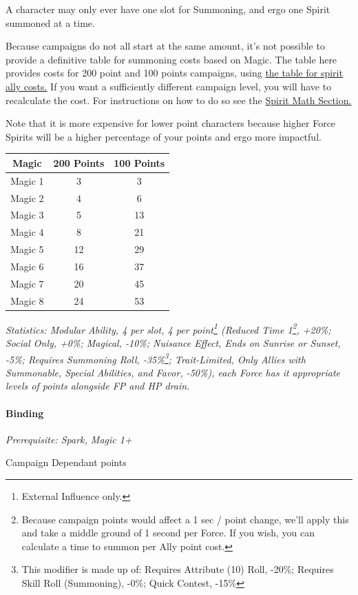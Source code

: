 \begin{multicols*}{3}
	A character may only ever have one slot for Summoning, and ergo one Spirit summoned at a time.
	
	Because campaigns do not all start at the same amount, it's not possible to provide a definitive table for summoning costs based on Magic. The table here provides costs for 200 point and 100 points campaigns, using \hyperref[spirit_ally_cost]{the table for spirit ally costs.} If you want a sufficiently different campaign level, you will have to recalculate the cost. For instructions on how to do so see the \hyperref[spirit_math]{Spirit Math Section.} 
	
	Note that it is more expensive for lower point characters because higher Force Spirits will be a higher percentage of your points and ergo more impactful.
	
	\begin{center}
		\begin{tabular}{|c|c|c|}
			\hline
			Magic & 200 Points & 100 Points \\
			\hline
			\hline
			Magic 1 & 3 & 3 \\
			Magic 2 & 4 & 6 \\
			Magic 3 & 5 & 13 \\
			Magic 4 & 8 & 21 \\
			Magic 5 & 12 & 29 \\
			Magic 6 & 16 & 37 \\
			Magic 7 & 20 & 45 \\
			Magic 8 & 24 & 53 \\
			\hline
		\end{tabular}
	\end{center}
	
	\textit{\textcolor{OliveGreen}{Statistics: Modular Ability, 4 per slot, 4 per point\footnote{External Influence only.} (Reduced Time 1\footnote{Because campaign points would affect a 1 sec / point change, we'll apply this and take a middle ground of 1 second per Force. If you wish, you can calculate a time to summon per Ally point cost.}, +20\%; Social Only, +0\%; Magical, -10\%; Nuisance Effect, Ends on Sunrise or Sunset, -5\%; Requires Summoning Roll, -35\%\footnote{This modifier is made up of: Requires Attribute (10) Roll, -20\%; Requires Skill Roll (Summoning), -0\%; Quick Contest, -15\%}; Trait-Limited, Only Allies with Summonable, Special Abilities, and Favor, -50\%), each Force has it appropriate levels of points alongside FP and HP drain.}}
	
	\paragraph{Binding}\label{binding_spirits}
	\textit{Prerequisite: Spark, Magic 1+}
	\begin{flushright}
		Campaign Dependant points
	\end{flushright}
		

\end{multicols*}
